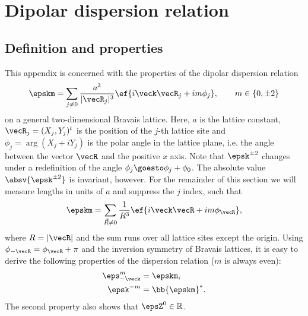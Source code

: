 \chapter{Dipolar dispersion relation}
\label{dipolar_dispersion}

\section{Definition and properties}
This appendix is concerned with the properties of the dipolar dispersion relation~\cite{Peter2012b,Syzranov2014,Peter2014}
\begin{align}
    \epskm = \sum_{j\ne 0} \frac{a^3}{|\vecR_j|^3}\ef{i\veck \vecR_j + i m \phi_{j}},\qquad m \in \{0, \pm 2\}
\end{align}
on a general two-dimensional Bravais lattice.
Here, $a$ is the lattice constant, $\vecR_j=(X_j, Y_j)^t$ is the position of the $j$-th lattice site and $\phi_j = \arg(X_j+i Y_j)$ is the polar angle in the lattice plane, i.e. the angle between the vector $\vecR$ and the positive $x$ axis. Note that $\epsk^{\pm 2}$ changes under a redefinition of the angle $\phi_j \goesto \phi_j + \phi_0$. The absolute value $\absv{\epsk^{\pm 2}}$ is invariant, however. For the remainder of this section we will measure lengths in units of $a$ and suppress the $j$ index, such that
\begin{align}
    \epskm = \sum_{\vec{R}\ne0} \frac{1}{R^3}\ef{i\veck \vecR + i m \phi_{\vecR}},
\end{align}
where $R=|\vecR|$ and the sum runs over all lattice sites except the origin.
Using $\phi_{-\vecR} = \phi_\vecR + \pi$ and the inversion symmetry of Bravais lattices,
it is easy to derive the following properties of the dispersion relation ($m$ is always even):
\begin{align}
    \eps_{-\veck}^m &= \epskm, \\
    \epsk^{-m} &= \bb{ \epskm }^*.
\end{align}
The second property also shows that $\epsZ^0 \in \mathbb{R}$.


